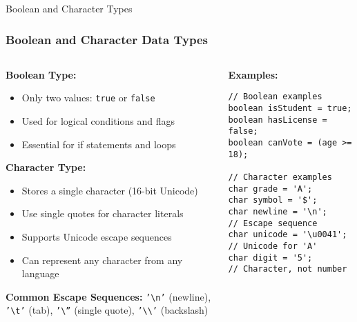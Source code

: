 \documentclass[aspectratio=169]{beamer}
\begin{document}
\begin{frame}[fragile]{Boolean and Character Types}
    \frametitle{Boolean and Character Data Types}
    
    \begin{columns}
        \begin{column}{0.5\textwidth}
            \textbf{Boolean Type:}
            \begin{itemize}
                \item Only two values: \texttt{true} or \texttt{false}
                \item Used for logical conditions and flags
                \item Essential for if statements and loops
            \end{itemize}
            
            \textbf{Character Type:}
            \begin{itemize}
                \item Stores a single character (16-bit Unicode)
                \item Use single quotes for character literals
                \item Supports Unicode escape sequences
                \item Can represent any character from any language
            \end{itemize}
            \tiny \textbf{Common Escape Sequences:} \texttt{'\textbackslash n'} (newline), \texttt{'\textbackslash t'} (tab), \texttt{'\textbackslash''} (single quote), \texttt{'\textbackslash\textbackslash'} (backslash)
        \end{column}
        
        \begin{column}{0.5\textwidth}
            \textbf{Examples:}
            \begin{lstlisting}
// Boolean examples
boolean isStudent = true;
boolean hasLicense = false;
boolean canVote = (age >= 18);

// Character examples
char grade = 'A';
char symbol = '$';
char newline = '\n';      // Escape sequence
char unicode = '\u0041';  // Unicode for 'A'
char digit = '5';         // Character, not number
            \end{lstlisting}
        \end{column}
    \end{columns}
    
    \vspace{0.5em}

\end{frame}
\end{document}
